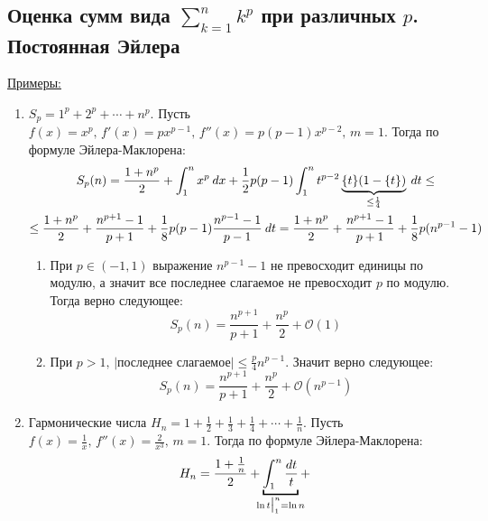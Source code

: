 \subsection{Оценка сумм вида $\sum_{k=1}^n k^p$ при различных $p$. Постоянная Эйлера}
\underline{Примеры:}

\begin{enumerate}
    \item $S_p = 1^p + 2^p + \dotsb + n^p$. Пусть $f(x) = x^p,\, f'(x) = px^{p - 1},\, f''(x) = p(p - 1)x^{p - 2},\, m = 1$. Тогда по формуле Эйлера-Маклорена:
    \begin{equation*}
      \begin{gathered}
        S_p(n) = \frac{1 + n^p}{2} + \int_{1}^{n} x^p \: dx + \frac{1}{2} p(p - 1) \int_{{1}}^{{n}} t^{p - 2}\underbrace{\{t\}(1 - \{t\})}_{\mathclap{\leq \frac{1}{4}}} \: d{t} \leq \\
        \leq \frac{1 + n^p}{2} + \frac{n^{p + 1} - 1}{p + 1} + \frac{1}{8}p(p - 1)
        \frac{n^{p - 1} - 1}{p - 1} \: dt =
        \frac{1 + n^p}{2} + \frac{n^{p + 1} - 1}{p + 1} + \frac{1}{8}p(n^{p - 1} - 1)
      \end{gathered}
    \end{equation*}
    \begin{enumerate}
        \item[] При $p \in (-1, 1)$ выражение $n^{p - 1} - 1$ не превосходит единицы по модулю, а значит все последнее слагаемое не превосходит $p$ по модулю. Тогда верно следующее:
        \begin{equation*}
            S_p(n) = \frac{n^{p + 1}}{p + 1} + \frac{n^p}{2} + \mathcal{O}(1)
        \end{equation*}
        \item[] При $p > 1, \, |\text{последнее слагаемое}| \leq \frac{p}{4} n^{p - 1}$. Значит верно следующее:
        \begin{equation*}
            S_p(n) = \frac{n^{p + 1}}{p + 1} + \frac{n^p}{2} + \mathcal{O}(n^{p - 1})
        \end{equation*}
    \end{enumerate}
    \item Гармонические числа $H_n = 1 + \frac{1}{2} + \frac{1}{3} + \frac{1}{4} + \dotsb + \frac{1}{n}$. Пусть $f(x) = \frac{1}{x}, \, f''(x) = \frac{2}{x^3}, \, m = 1$. Тогда по формуле Эйлера-Маклорена:
    \begin{equation*}
        H_n = \frac{1 + \frac{1}{n}}{2} + \underbracket{\int_{1}^{n} \frac{dt}{t}}_{\mathclap{\ln t \big|_{1}^{n} = \ln n}} +

\end{equation*}
\end{enumerate}

